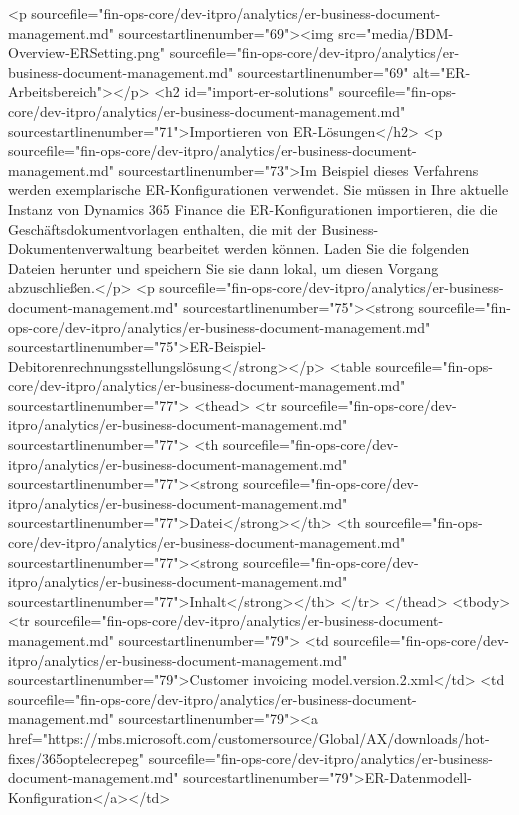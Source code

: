 <p sourcefile="fin-ops-core/dev-itpro/analytics/er-business-document-management.md" sourcestartlinenumber="69"><img src="media/BDM-Overview-ERSetting.png" sourcefile="fin-ops-core/dev-itpro/analytics/er-business-document-management.md" sourcestartlinenumber="69" alt="ER-Arbeitsbereich"></p>
<h2 id="import-er-solutions" sourcefile="fin-ops-core/dev-itpro/analytics/er-business-document-management.md" sourcestartlinenumber="71">Importieren von ER-Lösungen</h2>
<p sourcefile="fin-ops-core/dev-itpro/analytics/er-business-document-management.md" sourcestartlinenumber="73">Im Beispiel dieses Verfahrens werden exemplarische ER-Konfigurationen verwendet. Sie müssen in Ihre aktuelle Instanz von Dynamics 365 Finance die ER-Konfigurationen importieren, die die Geschäftsdokumentvorlagen enthalten, die mit der Business-Dokumentenverwaltung bearbeitet werden können. Laden Sie die folgenden Dateien herunter und speichern Sie sie dann lokal, um diesen Vorgang abzuschließen.</p>
<p sourcefile="fin-ops-core/dev-itpro/analytics/er-business-document-management.md" sourcestartlinenumber="75"><strong sourcefile="fin-ops-core/dev-itpro/analytics/er-business-document-management.md" sourcestartlinenumber="75">ER-Beispiel-Debitorenrechnungsstellungslösung</strong></p>
<table sourcefile="fin-ops-core/dev-itpro/analytics/er-business-document-management.md" sourcestartlinenumber="77">
<thead>
<tr sourcefile="fin-ops-core/dev-itpro/analytics/er-business-document-management.md" sourcestartlinenumber="77">
<th sourcefile="fin-ops-core/dev-itpro/analytics/er-business-document-management.md" sourcestartlinenumber="77"><strong sourcefile="fin-ops-core/dev-itpro/analytics/er-business-document-management.md" sourcestartlinenumber="77">Datei</strong></th>
<th sourcefile="fin-ops-core/dev-itpro/analytics/er-business-document-management.md" sourcestartlinenumber="77"><strong sourcefile="fin-ops-core/dev-itpro/analytics/er-business-document-management.md" sourcestartlinenumber="77">Inhalt</strong></th>
</tr>
</thead>
<tbody>
<tr sourcefile="fin-ops-core/dev-itpro/analytics/er-business-document-management.md" sourcestartlinenumber="79">
<td sourcefile="fin-ops-core/dev-itpro/analytics/er-business-document-management.md" sourcestartlinenumber="79">Customer invoicing model.version.2.xml</td>
<td sourcefile="fin-ops-core/dev-itpro/analytics/er-business-document-management.md" sourcestartlinenumber="79"><a href="https://mbs.microsoft.com/customersource/Global/AX/downloads/hot-fixes/365optelecrepeg" sourcefile="fin-ops-core/dev-itpro/analytics/er-business-document-management.md" sourcestartlinenumber="79">ER-Datenmodell-Konfiguration</a></td>
